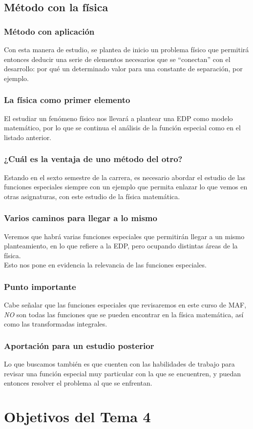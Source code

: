 \documentclass[12pt]{beamer}
\begin{document}
\subsection{Método con la física}

\begin{frame}
\frametitle{Método con aplicación}
Con esta manera de estudio, se plantea de inicio un problema físico que permitirá entonces deducir una serie de elementos necesarios que se \enquote{conectan} con el desarrollo: por qué un determinado valor para una constante de separación, por ejemplo.
\end{frame}
\begin{frame}
\frametitle{La física como primer elemento}
El estudiar un fenómeno físico nos llevará a plantear una EDP como modelo matemático, por lo que se continua el análisis de la función especial como en el listado anterior.
\end{frame}
\begin{frame}
\frametitle{¿Cuál es la ventaja de uno método del otro?}
Estando en el sexto semestre de la carrera, es necesario abordar el estudio de las funciones especiales siempre con un ejemplo que permita enlazar lo que vemos en otras asignaturas, con este estudio de la física matemática.
\end{frame}
\begin{frame}
\frametitle{Varios caminos para llegar a lo mismo}
Veremos que habrá varias funciones especiales que permitirán llegar a un mismo planteamiento, en lo que refiere a la EDP, pero ocupando distintas áreas de la física.
\\
\bigskip
\pause
Esto nos pone en evidencia la relevancia de las funciones especiales.
\end{frame}
\begin{frame}
\frametitle{Punto importante}
Cabe señalar que las funciones especiales que revisaremos en este curso de MAF, \emph{NO} son todas las funciones que se pueden encontrar en la física matemática, así como las transformadas integrales.
\end{frame}
\begin{frame}
\frametitle{Aportación para un estudio posterior}
Lo que buscamos también es que cuenten con las habilidades de trabajo para revisar una función especial muy particular con la que se encuentren, y puedan entonces resolver el problema al que se enfrentan.
\end{frame}

\section{Objetivos del Tema 4}
\end{document}
